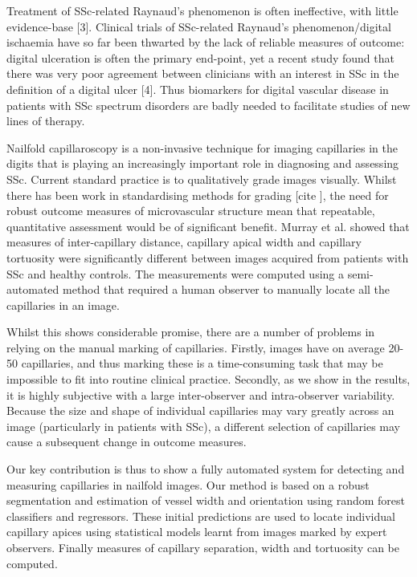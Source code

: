 \documentclass[runningheads,a4paper]{llncs}
\begin{document}
Treatment of SSc-related Raynaud's phenomenon is often ineffective, with little evidence-base [3]. Clinical trials of SSc-related Raynaud's phenomenon/digital ischaemia have so far been thwarted by the lack of reliable measures of outcome: digital ulceration is often the primary end-point, yet a recent study found that there was very poor agreement between clinicians with an interest in SSc in the definition of a digital ulcer [4]. Thus biomarkers for digital vascular disease in patients with SSc spectrum disorders are badly needed to facilitate studies of new lines of therapy.

Nailfold capillaroscopy is a non-invasive technique for imaging capillaries in the digits that is playing an increasingly important role in diagnosing and assessing SSc. Current standard practice is to qualitatively grade images visually. Whilst there has been work in standardising methods for grading [cite ],  the need for robust outcome measures of microvascular structure mean that repeatable, quantitative assessment would be of significant benefit.
Murray et al. showed that measures of inter-capillary distance, capillary apical width and capillary tortuosity were significantly different between images acquired from patients with SSc and healthy controls. The measurements were computed using a semi-automated method that required a human observer to manually locate all the capillaries in an image.

Whilst this shows considerable promise, there are a number of problems in relying on the manual marking of capillaries. Firstly, images have on average 20-50 capillaries, and thus marking these is a time-consuming task that may be impossible to fit into routine clinical practice. Secondly, as we show in the results, it is highly subjective with a large inter-observer and intra-observer variability. Because the size and shape of individual capillaries may vary greatly across an image (particularly in patients with SSc), a different selection of capillaries may cause a subsequent change in outcome measures.

Our key contribution is thus to show a fully automated system for detecting and measuring capillaries in nailfold images. Our method is based on a robust segmentation and estimation of vessel width and orientation using random forest classifiers and regressors. These initial predictions are used to locate individual capillary apices using statistical models learnt from images marked by expert observers. Finally measures of capillary separation, width and tortuosity can be computed.
\end{document}
